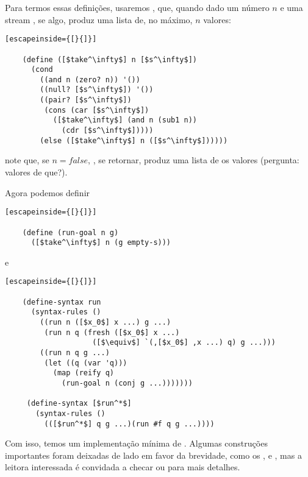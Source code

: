   Para termos essas definições, usaremos ,
  que, quando dado um número $n$ e uma stream , se
  algo, produz uma lista de, no máximo, $n$ valores:

  \begin{lstlisting}[escapeinside={[}{]}]

    (define ([$take^\infty$] n [$s^\infty$])
      (cond
        ((and n (zero? n)) '())
        ((null? [$s^\infty$]) '())
        ((pair? [$s^\infty$])
         (cons (car [$s^\infty$])
           ([$take^\infty$] (and n (sub1 n))
             (cdr [$s^\infty$]))))
        (else ([$take^\infty$] n ([$s^\infty$])))))

  \end{lstlisting}

  \noindent note que, se $n = false$, , se
  retornar, produz uma lista de  os valores (pergunta:
  valores de que?).

  Agora podemos definir

  \begin{lstlisting}[escapeinside={[}{]}]

    (define (run-goal n g)
      ([$take^\infty$] n (g empty-s)))

  \end{lstlisting}

  \noindent e

  \begin{lstlisting}[escapeinside={[}{]}]

    (define-syntax run
      (syntax-rules ()
        ((run n ([$x_0$] x ...) g ...)
         (run n q (fresh ([$x_0$] x ...)
                    ([$\equiv$] `(,[$x_0$] ,x ...) q) g ...)))
        ((run n q g ...)
         (let ((q (var 'q)))
           (map (reify q)
             (run-goal n (conj g ...)))))))

     (define-syntax [$run^*$]
       (syntax-rules ()
         (([$run^*$] q g ...)(run #f q g ...))))

  \end{lstlisting}

  Com isso, temos um implementação mínima de
  . Algumas construções importantes foram
  deixadas de lado em favor da brevidade, como os
  ,  e ,
  mas a leitora interessada é convidada a checar \cite{will} ou
  \cite{kanren} para mais detalhes.
  
  

